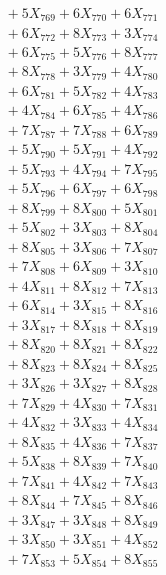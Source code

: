 \documentclass[a4paper,10pt]{article}
\begin{document}
{\begin{align}
&\;  + 5 X_{769} + 6 X_{770} + 6 X_{771} \\[0.3ex]
&\;  + 6 X_{772} + 8 X_{773} + 3 X_{774} \\[0.3ex]
&\;  + 6 X_{775} + 5 X_{776} + 8 X_{777} \\[0.3ex]
&\;  + 8 X_{778} + 3 X_{779} + 4 X_{780} \\[0.3ex]
&\;  + 6 X_{781} + 5 X_{782} + 4 X_{783} \\[0.3ex]
&\;  + 4 X_{784} + 6 X_{785} + 4 X_{786} \\[0.3ex]
&\;  + 7 X_{787} + 7 X_{788} + 6 X_{789} \\[0.5ex]\allowbreak
&\;  + 5 X_{790} + 5 X_{791} + 4 X_{792} \\[0.3ex]
&\;  + 5 X_{793} + 4 X_{794} + 7 X_{795} \\[0.3ex]
&\;  + 5 X_{796} + 6 X_{797} + 6 X_{798} \\[0.3ex]
&\;  + 8 X_{799} + 8 X_{800} + 5 X_{801} \\[0.3ex]
&\;  + 5 X_{802} + 3 X_{803} + 8 X_{804} \\[0.3ex]
&\;  + 8 X_{805} + 3 X_{806} + 7 X_{807} \\[0.3ex]
&\;  + 7 X_{808} + 6 X_{809} + 3 X_{810} \\[0.3ex]
&\;  + 4 X_{811} + 8 X_{812} + 7 X_{813} \\[0.3ex]
&\;  + 6 X_{814} + 3 X_{815} + 8 X_{816} \\[0.3ex]
&\;  + 3 X_{817} + 8 X_{818} + 8 X_{819} \\[0.5ex]\allowbreak
&\;  + 8 X_{820} + 8 X_{821} + 8 X_{822} \\[0.3ex]
&\;  + 8 X_{823} + 8 X_{824} + 8 X_{825} \\[0.3ex]
&\;  + 3 X_{826} + 3 X_{827} + 8 X_{828} \\[0.3ex]
&\;  + 7 X_{829} + 4 X_{830} + 7 X_{831} \\[0.3ex]
&\;  + 4 X_{832} + 3 X_{833} + 4 X_{834} \\[0.3ex]
&\;  + 8 X_{835} + 4 X_{836} + 7 X_{837} \\[0.3ex]
&\;  + 5 X_{838} + 8 X_{839} + 7 X_{840} \\[0.3ex]
&\;  + 7 X_{841} + 4 X_{842} + 7 X_{843} \\[0.3ex]
&\;  + 8 X_{844} + 7 X_{845} + 8 X_{846} \\[0.3ex]
&\;  + 3 X_{847} + 3 X_{848} + 8 X_{849} \\[0.5ex]\allowbreak
&\;  + 3 X_{850} + 3 X_{851} + 4 X_{852} \\[0.3ex]
&\;  + 7 X_{853} + 5 X_{854} + 8 X_{855} \\[0.3ex]

\end{align}}
\end{document}
